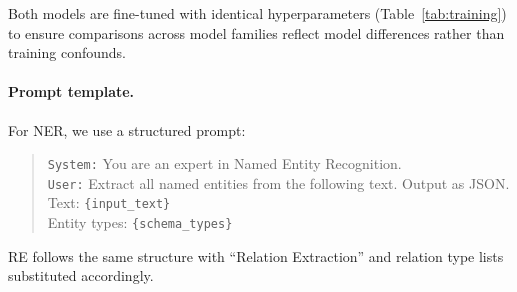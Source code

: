 Both models are fine-tuned with identical hyperparameters (Table~\ref{tab:training}) to ensure comparisons across model families reflect model differences rather than training confounds.

\begin{table}[t]
\centering
\small
\caption{Training configuration. Both Qwen3-8B and LLaMA-3.1-8B-Instruct use identical settings unless noted.}
\label{tab:training}
\end{table}

\paragraph{Prompt template.}
For NER, we use a structured prompt:
\begin{quote}
\small
\texttt{System:} You are an expert in Named Entity Recognition.\\
\texttt{User:} Extract all named entities from the following text. Output as JSON.\\
Text: \texttt{\{input\_text\}}\\
Entity types: \texttt{\{schema\_types\}}
\end{quote}
RE follows the same structure with ``Relation Extraction'' and relation type lists substituted accordingly.

